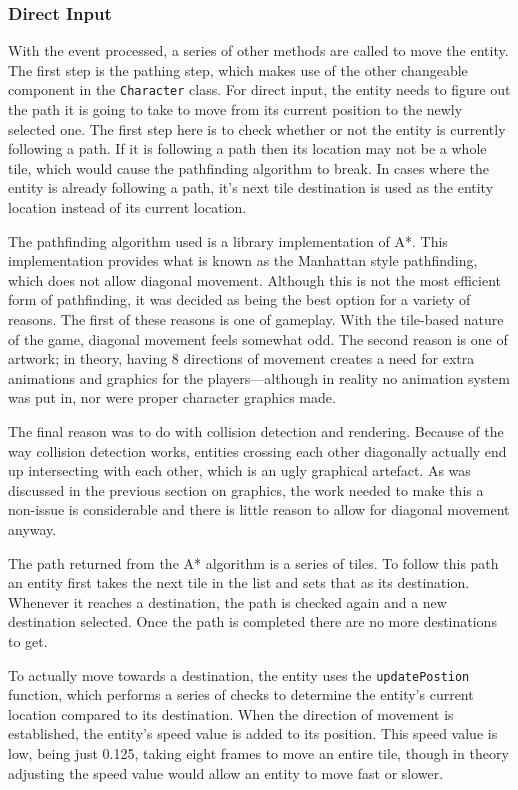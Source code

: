 \subsubsection{Direct Input}
With the event processed, a series of other methods are called to move the entity. The first step is the pathing step, which makes use of the other changeable component in the \texttt{Character} class. For direct input, the entity needs to figure out the path it is going to take to move from its current position to the newly selected one. The first step here is to check whether or not the entity is currently following a path. If it is following a path then its location may not be a whole tile, which would cause the pathfinding algorithm to break. In cases where the entity is already following a path, it's next tile destination is used as the entity location instead of its current location.

The pathfinding algorithm used is a library implementation of A*. This implementation provides what is known as the Manhattan style pathfinding, which does not allow diagonal movement. Although this is not the most efficient form of pathfinding, it was decided as being the best option for a variety of reasons. The first of these reasons is one of gameplay. With the tile-based nature of the game, diagonal movement feels somewhat odd. The second reason is one of artwork; in theory, having 8 directions of movement creates a need for extra animations and graphics for the players---although in reality no animation system was put in, nor were proper character graphics made.

The final reason was to do with collision detection and rendering. Because of the way collision detection works, entities crossing each other diagonally actually end up intersecting with each other, which is an ugly graphical artefact. As was discussed in the previous section on graphics, the work needed to make this a non-issue is considerable and there is little reason to allow for diagonal movement anyway.

The path returned from the A* algorithm is a series of tiles. To follow this path an entity first takes the next tile in the list and sets that as its destination. Whenever it reaches a destination, the path is checked again and a new destination selected. Once the path is completed there are no more destinations to get.

To actually move towards a destination, the entity uses the \texttt{updatePostion} function, which performs a series of checks to determine the entity's current location compared to its destination. When the direction of movement is established, the entity's speed value is added to its position. This speed value is low, being just 0.125, taking eight frames to move an entire tile, though in theory adjusting the speed value would allow an entity to move fast or slower.

